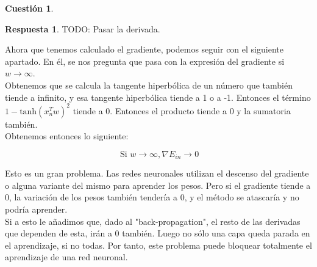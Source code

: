 \documentclass[10pt,a4paper]{article}
\theoremstyle{definition}
\newtheorem{cuestion}{Cuestión}
\newtheorem*{respuesta}{Respuesta}
\begin{document}
\begin{cuestion}
\end{cuestion}
\begin{respuesta}
TODO: Pasar la derivada.

Ahora que tenemos calculado el gradiente, podemos seguir con el siguiente apartado. En él, se nos pregunta que pasa con la expresión del gradiente si $w \rightarrow \infty$.\\

Obtenemos que se calcula la tangente hiperbólica de un número que también tiende a infinito, y esa tangente hiperbólica tiende a 1 o a -1. Entonces el término $1-\textrm{tanh}(x_n^Tw)^2$ tiende a 0. Entonces el producto tiende a 0 y la sumatoria también.\\
 
Obtenemos entonces lo siguiente:

\[
\ \textrm{Si }w \rightarrow \infty ,  \nabla E_{in} \rightarrow 0
\]

Esto es un gran problema. Las redes neuronales utilizan el descenso del gradiente o alguna variante del mismo para aprender los pesos. Pero si el gradiente tiende a 0, la variación de los pesos también tendería a 0, y el método se atascaría y no podría aprender.\\

Si a esto le añadimos que, dado al "back-propagation", el resto de las derivadas que dependen de esta, irán a 0 también. Luego no sólo una capa queda parada en el aprendizaje, si no todas. Por tanto, este problema puede bloquear totalmente el aprendizaje de una red neuronal.

\end{respuesta}
\end{document}
